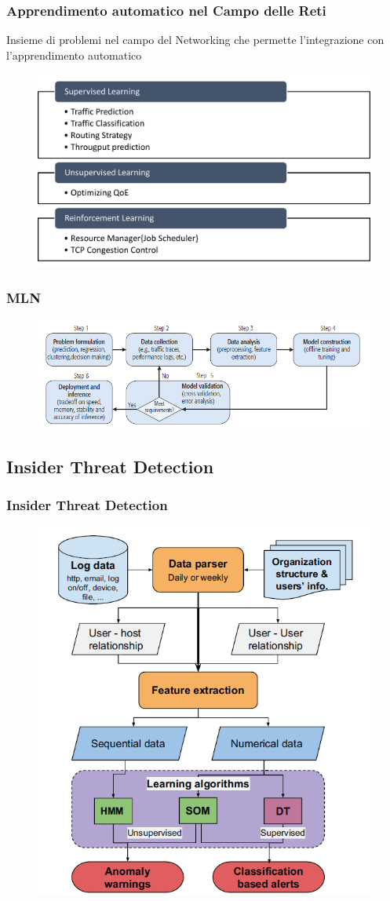 \documentclass[xcolor=dvipsnames]{beamer}
\begin{document}
    \begin{frame}
    \frametitle{Apprendimento automatico nel Campo delle Reti} %
   Insieme di problemi nel campo del Networking che permette l'integrazione con l'apprendimento automatico
    \begin{figure}[htbp]
        \includegraphics[width=.75\textwidth,height=.62\textheight]{RicercaMLNetworking.png}
    \end{figure}
\end{frame}

\begin{frame}
    \frametitle{MLN}
    \begin{figure}
        \includegraphics[width=.95\textwidth,height=.42\textheight]{WorkFlowNetworking.png}
    \end{figure}
    

\end{frame}
\subsection{Insider Threat Detection}
\begin{frame}
    \frametitle{Insider Threat Detection}
    \begin{figure}
        \includegraphics[width=.60\textwidth,height=.80\textheight]{workflowIntrusionThreat.png}
    \end{figure}
\end{frame}
\end{document}
